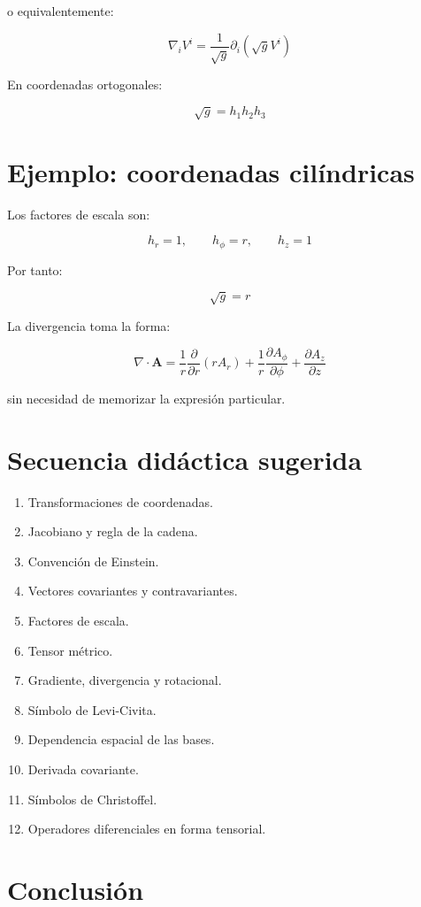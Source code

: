 \documentclass[12pt]{article}
\begin{document}
o equivalentemente:

\[
\nabla_iV^i
=
\frac{1}{\sqrt{g}}
\partial_i
\left(
\sqrt{g}V^i
\right)
\]

En coordenadas ortogonales:

\[
\sqrt{g}=h_1h_2h_3
\]

\section{Ejemplo: coordenadas cilíndricas}

Los factores de escala son:

\[
h_r=1,
\qquad
h_{\phi}=r,
\qquad
h_z=1
\]

Por tanto:

\[
\sqrt{g}=r
\]

La divergencia toma la forma:

\[
\nabla\cdot\mathbf{A}
=
\frac{1}{r}
\frac{\partial}{\partial r}
(rA_r)
+
\frac{1}{r}
\frac{\partial A_{\phi}}{\partial \phi}
+
\frac{\partial A_z}{\partial z}
\]

sin necesidad de memorizar la expresión particular.

\section{Secuencia didáctica sugerida}

\begin{enumerate}
    \item Transformaciones de coordenadas.
    \item Jacobiano y regla de la cadena.
    \item Convención de Einstein.
    \item Vectores covariantes y contravariantes.
    \item Factores de escala.
    \item Tensor métrico.
    \item Gradiente, divergencia y rotacional.
    \item Símbolo de Levi-Civita.
    \item Dependencia espacial de las bases.
    \item Derivada covariante.
    \item Símbolos de Christoffel.
    \item Operadores diferenciales en forma tensorial.
\end{enumerate}

\section{Conclusión}
\end{document}
